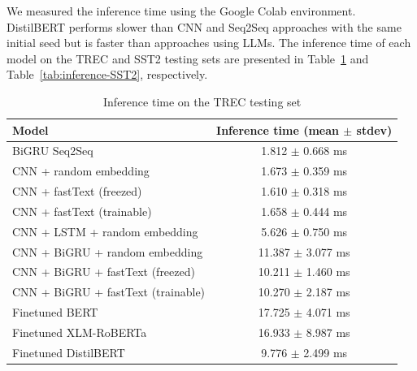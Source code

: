 \documentclass[sn-mathphys,Numbered]{sn-jnl}%
\theoremstyle{thmstyleone}%
\theoremstyle{thmstyletwo}%
\theoremstyle{thmstylethree}%
\begin{document}
We measured the inference time using the Google Colab environment. DistilBERT performs slower than CNN and Seq2Seq approaches with the same initial seed but is faster than approaches using LLMs. The inference time of each model on the TREC and SST2 testing sets are presented in Table~\ref{tab:inference-TREC} and Table~\ref{tab:inference-SST2}, respectively.

\begin{table}
\caption{Inference time on the TREC testing set}\label{tab:inference-TREC}
\begin{tabular*}{\textwidth}{@{\extracolsep\fill}lc}
\toprule
\textbf{Model}                     & \textbf{Inference time (mean $\pm$ stdev)} \\ \midrule
BiGRU Seq2Seq                      & 1.812 $\pm$ 0.668 ms                     \\ \midrule
CNN + random embedding             & 1.673 $\pm$ 0.359 ms                     \\
CNN + fastText (freezed)           & 1.610 $\pm$ 0.318 ms                     \\
CNN + fastText (trainable)         & 1.658 $\pm$ 0.444 ms                     \\ \midrule
CNN + LSTM + random embedding      & 5.626 $\pm$ 0.750 ms                     \\
CNN + BiGRU + random embedding     & 11.387 $\pm$ 3.077 ms                    \\
CNN + BiGRU + fastText (freezed)   & 10.211 $\pm$ 1.460 ms                    \\
CNN + BiGRU + fastText (trainable) & 10.270 $\pm$ 2.187 ms                    \\ \midrule
Finetuned BERT                     & 17.725 $\pm$ 4.071 ms                    \\
Finetuned XLM-RoBERTa              & 16.933 $\pm$ 8.987 ms                    \\ \midrule
Finetuned DistilBERT\footnotemark[1]               & 9.776 $\pm$ 2.499 ms                     \\ \bottomrule
\end{tabular*}
\end{table}
\end{document}
